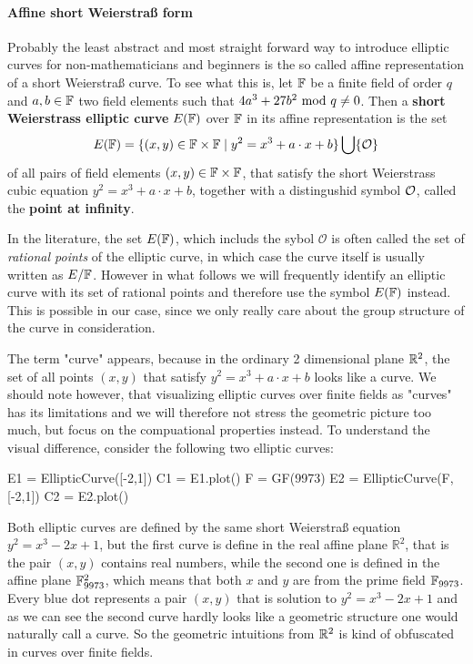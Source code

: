 \paragraph{Affine short Weierstraß form} Probably the least abstract and most straight forward way to introduce elliptic curves for non-mathematicians and beginners is the so called affine representation of a short Weierstraß curve. To see what this is, let $\mathbb{F}$ be a finite field of order $q$ and $a,b\in \mathbb{F}$ two field elements such that $4a^3+ 27b^2 \text{ mod } q\neq 0$. Then a \textbf{short Weierstrass elliptic curve} $E(\mathbb{F})$ over $\mathbb{F}$ in its affine representation is the set
\begin{equation}
\label{def_short_weierstrass_curve}
E(\mathbb{F}) = \{(x,y)\in \mathbb{F}\times \mathbb{F}\;|\; y^2=x^3+a\cdot x+b \} \bigcup \{\mathcal{O}\}
\end{equation}
of all pairs of field elements $(x,y)\in \mathbb{F}\times \mathbb{F}$, that satisfy the short Weierstrass cubic equation $y^2=x^3+a\cdot x+b$, together with a distingushid symbol $\mathcal{O}$, called the \textbf{point at infinity}.
\begin{notation}
In the literature, the set $E(\mathbb{F})$, which includs the sybol $\mathcal{O}$ is often called the set of \textit{rational points} of the elliptic curve, in which case the curve itself is usually written as $E/\mathbb{F}$. However in what follows we will frequently identify an elliptic curve with its set of rational points and therefore use the symbol $E(\mathbb{F})$ instead. This is possible in our case, since we only really care about the group structure of the curve in consideration.
\end{notation}
The term "curve" appears, because in the ordinary 2 dimensional plane $\mathbb{R}^2$,
the set of all points $(x,y)$ that satisfy $y^2 = x^3 +a\cdot x +b$ looks like a curve. We should note however, that visualizing elliptic curves over finite fields as "curves" has its limitations and we will therefore not stress the geometric picture too much, but focus on the compuational properties instead. To understand the visual difference, consider the following two elliptic curves:
\begin{sagesilent}
E1 = EllipticCurve([-2,1])
C1 = E1.plot()
F = GF(9973)
E2 = EllipticCurve(F, [-2,1])
C2 = E2.plot()
\end{sagesilent}
\begin{center}
\end{center}
Both elliptic curves are defined by the same short Weierstraß equation $y^2 = x^3-2x+1$, but the first curve is define in the real affine plane $\mathbb{R}^2$, that is the pair $(x,y)$ contains real numbers, while the second one is defined in the affine plane $\mathbb{F}_{9973}^2$, which means that both $x$ and $y$ are from the prime field $\mathbb{F}_{9973}$. Every blue dot represents a pair $(x,y)$ that is solution to $y^2 = x^3-2x+1$ and as we can see the second curve hardly looks like a geometric structure one would naturally call a curve. So the geometric intuitions from $\mathbb{R}^2$ is kind of obfuscated in curves over finite fields.

